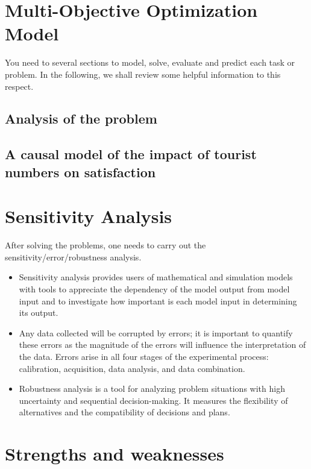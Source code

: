 \documentclass[12pt]{article}  %
\begin{document}
 \section{Multi-Objective Optimization Model}
 
 You need to several sections to model, solve, evaluate and predict each task or problem. In the following, we shall review some helpful information to this respect.
 
 \subsection{Analysis of the problem}
 
  \subsection{A causal model of the impact of tourist numbers on satisfaction}
 
 

 \section{Sensitivity Analysis}
 
 After solving the problems, one needs to carry out the sensitivity/error/robustness analysis.
 
 \begin{itemize}
     \setlength{\parsep}{0ex} %
     \setlength{\topsep}{2ex} %
     \setlength{\itemsep}{1ex} %
     \item Sensitivity analysis provides users of mathematical and simulation models with tools to appreciate the dependency of the model output from model input and to investigate how important is each model input in determining its output.
     \item Any data collected will be corrupted by errors; it is important to quantify these errors as the magnitude of the errors will influence the interpretation of the data. Errors arise in all four stages of the experimental process: calibration, acquisition, data analysis, and data combination.
     \item Robustness analysis is a tool for analyzing problem situations with high uncertainty and sequential decision-making. It measures the flexibility of alternatives and the compatibility of decisions and plans.
 \end{itemize}
 
 \section{Strengths and weaknesses}
 
\end{document}

